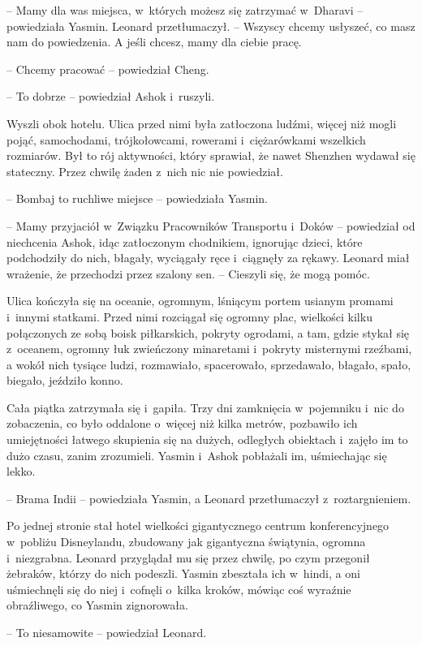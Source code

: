 \documentclass[oneside,polish,11pt,rmheadings]{mwbk}
\begin{document}
-- Mamy dla was miejsca, w~których możesz się zatrzymać w~Dharavi -- powiedziała Yasmin. Leonard przetłumaczył. -- Wszyscy chcemy usłyszeć, co masz nam do powiedzenia. A jeśli chcesz, mamy dla ciebie pracę.

-- Chcemy pracować -- powiedział Cheng.

-- To dobrze -- powiedział Ashok i~ruszyli.

Wyszli obok hotelu. Ulica przed nimi była zatłoczona ludźmi, więcej niż mogli pojąć, samochodami, trójkołowcami, rowerami i~ciężarówkami wszelkich rozmiarów. Był to rój aktywności, który sprawiał, że nawet Shenzhen wydawał się stateczny. Przez chwilę żaden z~nich nic nie powiedział.

-- Bombaj to ruchliwe miejsce -- powiedziała Yasmin.

-- Mamy przyjaciół w~Związku Pracowników Transportu i~Doków -- powiedział od niechcenia Ashok, idąc zatłoczonym chodnikiem, ignorując dzieci, które podchodziły do nich, błagały, wyciągały ręce i~ciągnęły za rękawy. Leonard miał wrażenie, że przechodzi przez szalony sen. -- Cieszyli się, że mogą pomóc.

Ulica kończyła się na oceanie, ogromnym, lśniącym portem usianym promami i~innymi statkami. Przed nimi rozciągał się ogromny plac, wielkości kilku połączonych ze sobą boisk piłkarskich, pokryty ogrodami, a tam, gdzie stykał się z~oceanem, ogromny łuk zwieńczony minaretami i~pokryty misternymi rzeźbami, a wokół nich tysiące ludzi, rozmawiało, spacerowało, sprzedawało, błagało, spało, biegało, jeździło konno.

Cała piątka zatrzymała się i~gapiła. Trzy dni zamknięcia w~pojemniku i~nic do zobaczenia, co było oddalone o~więcej niż kilka metrów, pozbawiło ich umiejętności łatwego skupienia się na dużych, odległych obiektach i~zajęło im to dużo czasu, zanim zrozumieli. Yasmin i~Ashok pobłażali im, uśmiechając się lekko.

-- Brama Indii -- powiedziała Yasmin, a Leonard przetłumaczył z~roztargnieniem.

Po jednej stronie stał hotel wielkości gigantycznego centrum konferencyjnego w~pobliżu Disneylandu, zbudowany jak gigantyczna świątynia, ogromna i~niezgrabna. Leonard przyglądał mu się przez chwilę, po czym przegonił żebraków, którzy do nich podeszli. Yasmin zbeształa ich w~hindi, a oni uśmiechnęli się do niej i~cofnęli o~kilka kroków, mówiąc coś wyraźnie obraźliwego, co Yasmin zignorowała.

-- To niesamowite -- powiedział Leonard.
\end{document}
